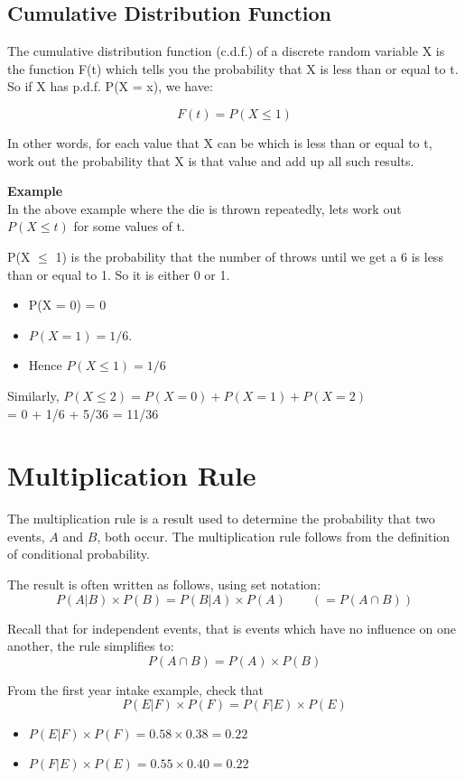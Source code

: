 \documentclass[]{report}
\begin{document}
{\subsection{Cumulative Distribution Function}

The cumulative distribution function (c.d.f.) of a discrete random variable X is the function F(t) which tells you the probability that X is less than or equal to t. So if X has p.d.f. P(X = x), we have:

\[F(t) = P(X \leq 1)\] %

In other words, for each value that X can be which is less than or equal to t, work out the probability that X is that value and add up all such results.




\textbf{Example}\\

In the above example where the die is thrown repeatedly, lets work out $P(X \leq t)$ for some values of t.

P(X $\leq$ 1) is the probability that the number of throws until we get a 6 is less than or equal to 1. So it is either 0 or 1. 

\begin{itemize}
\item P(X = 0) = 0 
\item $P(X = 1) = 1/6$.
\item  Hence $P(X \leq 1) = 1/6$
\end{itemize}

Similarly, $P(X \leq 2) = P(X = 0) + P(X = 1) + P(X = 2)$\\ = 0 + 1/6 + 5/36 = 11/36


\section{Multiplication Rule}
The multiplication rule is a result used to determine the probability that two events, $A$ and $B$, both occur.
The multiplication rule follows from the definition of conditional probability.\\ \bigskip

The result is often written as follows, using set notation:
\[ P(A|B)\times P(B) = P(B|A)\times P(A) \qquad \left( = P(A \cap B) \right) \]

Recall that for independent events, that is events which have no influence on one another, the rule simplifies to:
\[P(A \cap B)  = P(A)\times P(B) \]

From the first year intake example, check that
\[ P(E|F)\times P(F) = P(F|E)\times P(E)\]
\begin{itemize}
\item $P(E|F)\times P(F) = 0.58 \times 0.38  = 0.22$
\item $P(F|E)\times P(E) = 0.55 \times 0.40  = 0.22$
\end{itemize}

}
\end{document}
